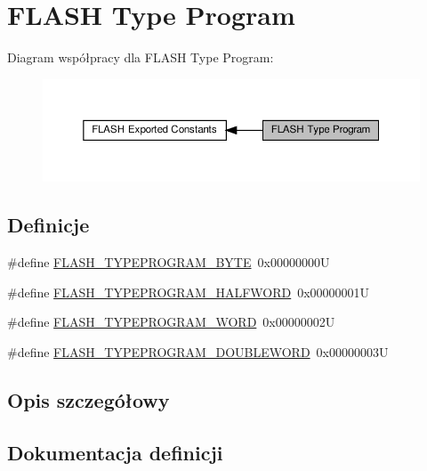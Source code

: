\hypertarget{group___f_l_a_s_h___type___program}{}\section{F\+L\+A\+SH Type Program}
\label{group___f_l_a_s_h___type___program}
Diagram współpracy dla F\+L\+A\+SH Type Program\+:\nopagebreak
\begin{figure}[H]
\begin{center}
\leavevmode
\includegraphics[width=350pt]{group___f_l_a_s_h___type___program}
\end{center}
\end{figure}
\subsection*{Definicje}
\begin{DoxyCompactItemize}
\item 
\#define \hyperlink{group___f_l_a_s_h___type___program_gac975d7139325057ed0069c6b55e4faed}{F\+L\+A\+S\+H\+\_\+\+T\+Y\+P\+E\+P\+R\+O\+G\+R\+A\+M\+\_\+\+B\+Y\+TE}~0x00000000U
\item 
\#define \hyperlink{group___f_l_a_s_h___type___program_ga2b607dfc2efd463a8530e327bc755582}{F\+L\+A\+S\+H\+\_\+\+T\+Y\+P\+E\+P\+R\+O\+G\+R\+A\+M\+\_\+\+H\+A\+L\+F\+W\+O\+RD}~0x00000001U
\item 
\#define \hyperlink{group___f_l_a_s_h___type___program_gadd25c6821539030ba6711e7c0d586c3e}{F\+L\+A\+S\+H\+\_\+\+T\+Y\+P\+E\+P\+R\+O\+G\+R\+A\+M\+\_\+\+W\+O\+RD}~0x00000002U
\item 
\#define \hyperlink{group___f_l_a_s_h___type___program_gabdc2b0b4d2e66c2be90fafbfbf1e225f}{F\+L\+A\+S\+H\+\_\+\+T\+Y\+P\+E\+P\+R\+O\+G\+R\+A\+M\+\_\+\+D\+O\+U\+B\+L\+E\+W\+O\+RD}~0x00000003U
\end{DoxyCompactItemize}


\subsection{Opis szczegółowy}


\subsection{Dokumentacja definicji}
\mbox{\label{group___f_l_a_s_h___type___program_gac975d7139325057ed0069c6b55e4faed}} 
